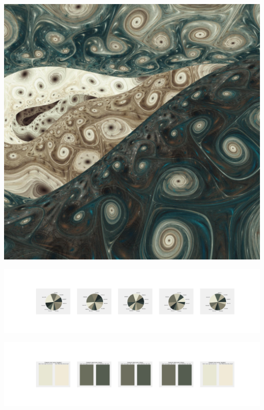 \documentclass[11pt]{article}
\begin{document}
\begin{landscape}
    \begin{center}
    \includegraphics[width=\textwidth]{./nbimg/file (340).jpg}
    \end{center}

    \begin{center}
    \includegraphics[width=250mm]{./nbimg/pie-268.jpg}
    \end{center}

    \begin{center}
    \includegraphics[width=250mm]{./nbimg/peak-268.jpg}
    \end{center}
    


\end{landscape}
\end{document}
